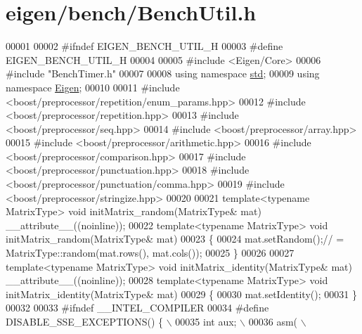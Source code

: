 \hypertarget{eigen_2bench_2_bench_util_8h_source}{}\section{eigen/bench/\+Bench\+Util.h}
\label{eigen_2bench_2_bench_util_8h_source}

\begin{DoxyCode}
00001 
00002 \textcolor{preprocessor}{#ifndef EIGEN\_BENCH\_UTIL\_H}
00003 \textcolor{preprocessor}{#define EIGEN\_BENCH\_UTIL\_H}
00004 
00005 \textcolor{preprocessor}{#include <Eigen/Core>}
00006 \textcolor{preprocessor}{#include "BenchTimer.h"}
00007 
00008 \textcolor{keyword}{using namespace }\hyperlink{namespacestd}{std};
00009 \textcolor{keyword}{using namespace }\hyperlink{namespace_eigen}{Eigen};
00010 
00011 \textcolor{preprocessor}{#include <boost/preprocessor/repetition/enum\_params.hpp>}
00012 \textcolor{preprocessor}{#include <boost/preprocessor/repetition.hpp>}
00013 \textcolor{preprocessor}{#include <boost/preprocessor/seq.hpp>}
00014 \textcolor{preprocessor}{#include <boost/preprocessor/array.hpp>}
00015 \textcolor{preprocessor}{#include <boost/preprocessor/arithmetic.hpp>}
00016 \textcolor{preprocessor}{#include <boost/preprocessor/comparison.hpp>}
00017 \textcolor{preprocessor}{#include <boost/preprocessor/punctuation.hpp>}
00018 \textcolor{preprocessor}{#include <boost/preprocessor/punctuation/comma.hpp>}
00019 \textcolor{preprocessor}{#include <boost/preprocessor/stringize.hpp>}
00020 
00021 \textcolor{keyword}{template}<\textcolor{keyword}{typename} MatrixType> \textcolor{keywordtype}{void} initMatrix\_random(MatrixType& mat) \_\_attribute\_\_((noinline));
00022 \textcolor{keyword}{template}<\textcolor{keyword}{typename} MatrixType> \textcolor{keywordtype}{void} initMatrix\_random(MatrixType& mat)
00023 \{
00024   mat.setRandom();\textcolor{comment}{// = MatrixType::random(mat.rows(), mat.cols());}
00025 \}
00026 
00027 \textcolor{keyword}{template}<\textcolor{keyword}{typename} MatrixType> \textcolor{keywordtype}{void} initMatrix\_identity(MatrixType& mat) \_\_attribute\_\_((noinline));
00028 \textcolor{keyword}{template}<\textcolor{keyword}{typename} MatrixType> \textcolor{keywordtype}{void} initMatrix\_identity(MatrixType& mat)
00029 \{
00030   mat.setIdentity();
00031 \}
00032 
00033 \textcolor{preprocessor}{#ifndef \_\_INTEL\_COMPILER}
00034 \textcolor{preprocessor}{#define DISABLE\_SSE\_EXCEPTIONS()  \{ \(\backslash\)}
00035 \textcolor{preprocessor}{  int aux; \(\backslash\)}
00036 \textcolor{preprocessor}{  asm( \(\backslash\)}

\end{DoxyCode}
